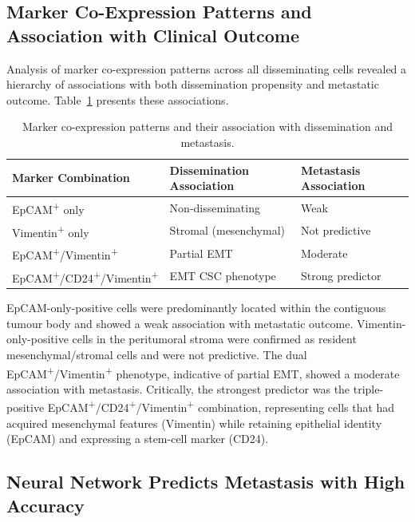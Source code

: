 \documentclass[11pt,a4paper]{article}
\begin{document}
\subsection{Marker Co-Expression Patterns and Association with Clinical Outcome}

Analysis of marker co-expression patterns across all disseminating cells revealed a hierarchy of associations with both dissemination propensity and metastatic outcome. Table~\ref{tab:coexpression} presents these associations.

\begin{table}[ht]
\centering
\caption{Marker co-expression patterns and their association with dissemination and metastasis.}
\label{tab:coexpression}
\begin{tabular}{@{}lll@{}}
\toprule
Marker Combination & Dissemination Association & Metastasis Association \\
\midrule
EpCAM\textsuperscript{+} only & Non-disseminating & Weak \\
Vimentin\textsuperscript{+} only & Stromal (mesenchymal) & Not predictive \\
EpCAM\textsuperscript{+}/Vimentin\textsuperscript{+} & Partial EMT & Moderate \\
EpCAM\textsuperscript{+}/CD24\textsuperscript{+}/Vimentin\textsuperscript{+} & EMT CSC phenotype & Strong predictor \\
\bottomrule
\end{tabular}
\end{table}

EpCAM-only-positive cells were predominantly located within the contiguous tumour body and showed a weak association with metastatic outcome. Vimentin-only-positive cells in the peritumoral stroma were confirmed as resident mesenchymal/stromal cells and were not predictive. The dual EpCAM\textsuperscript{+}/Vimentin\textsuperscript{+} phenotype, indicative of partial EMT, showed a moderate association with metastasis. Critically, the strongest predictor was the triple-positive EpCAM\textsuperscript{+}/CD24\textsuperscript{+}/Vimentin\textsuperscript{+} combination, representing cells that had acquired mesenchymal features (Vimentin) while retaining epithelial identity (EpCAM) and expressing a stem-cell marker (CD24).

\subsection{Neural Network Predicts Metastasis with High Accuracy}
\end{document}
